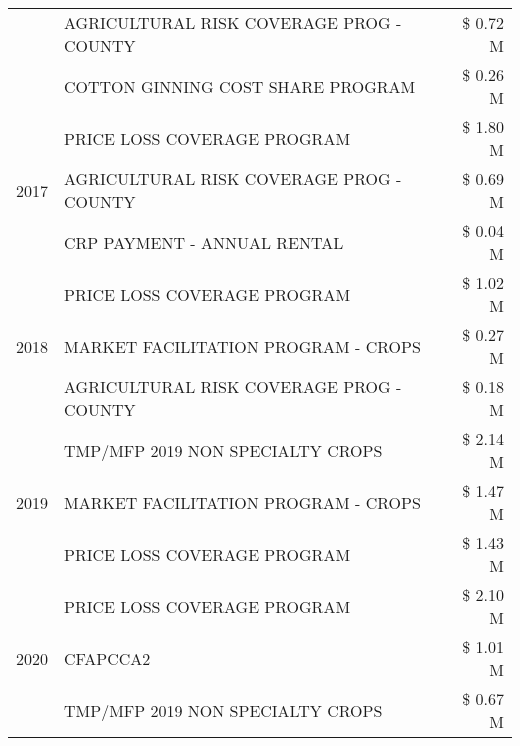 \begin{tabular}{llr}
 & AGRICULTURAL RISK COVERAGE PROG - COUNTY & \$ 0.72 M \\
 & COTTON GINNING COST SHARE PROGRAM & \$ 0.26 M \\
\cline{1-3}
\multirow[t]{3}{*}{2017} & PRICE LOSS COVERAGE PROGRAM & \$ 1.80 M \\
 & AGRICULTURAL RISK COVERAGE PROG - COUNTY & \$ 0.69 M \\
 & CRP PAYMENT - ANNUAL RENTAL & \$ 0.04 M \\
\cline{1-3}
\multirow[t]{3}{*}{2018} & PRICE LOSS COVERAGE PROGRAM & \$ 1.02 M \\
 & MARKET FACILITATION PROGRAM - CROPS & \$ 0.27 M \\
 & AGRICULTURAL RISK COVERAGE PROG - COUNTY & \$ 0.18 M \\
\cline{1-3}
\multirow[t]{3}{*}{2019} & TMP/MFP 2019 NON SPECIALTY CROPS & \$ 2.14 M \\
 & MARKET FACILITATION PROGRAM - CROPS & \$ 1.47 M \\
 & PRICE LOSS COVERAGE PROGRAM & \$ 1.43 M \\
\cline{1-3}
\multirow[t]{3}{*}{2020} & PRICE LOSS COVERAGE PROGRAM & \$ 2.10 M \\
 & CFAPCCA2 & \$ 1.01 M \\
 & TMP/MFP 2019 NON SPECIALTY CROPS & \$ 0.67 M \\
\cline{1-3}
\bottomrule
\end{tabular}
